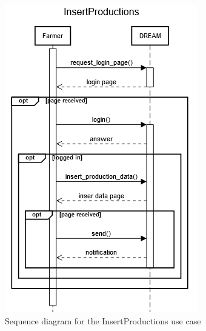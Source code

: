 \documentclass{article}
\begin{document}
\begin{figure}[H]
    \centering
    \includegraphics[scale=0.75]{sequence_diagrams/InsertProductions}
    \caption{Sequence diagram for the InsertProductions use case}
\end{figure}
\end{document}
